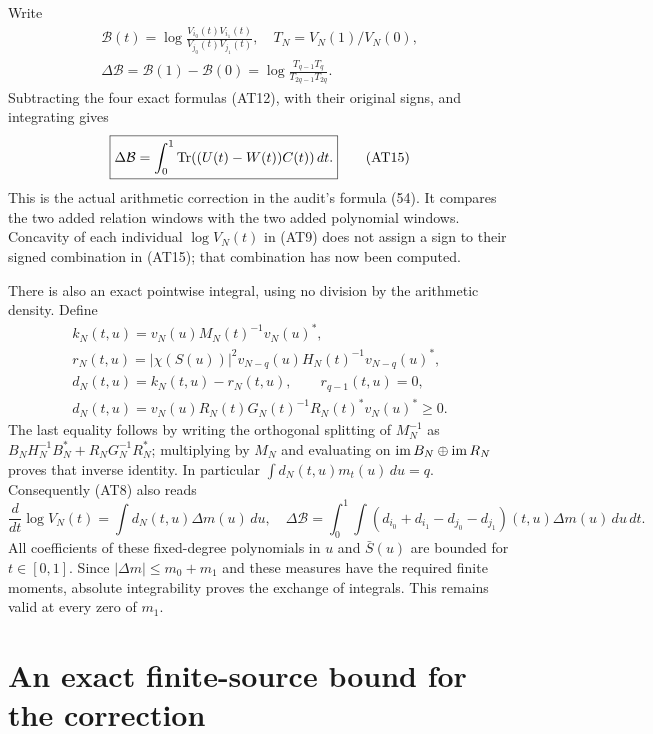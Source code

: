 Write
\[
 \begin{gathered}
 \mathcal B(t)=\log\frac{V_{i_0}(t)V_{i_1}(t)}{V_{j_0}(t)V_{j_1}(t)},
 \quad T_N=V_N(1)/V_N(0),\\
 \Delta\mathcal B=\mathcal B(1)-\mathcal B(0)
 =\log\frac{T_{q-1}T_q}{T_{2q-1}T_{2q}}.       \end{gathered}
 \tag{AT14}
\]
Subtracting the four exact formulas (AT12), with their original
signs, and integrating gives
\[
 \boxed{\displaystyle
 \Delta\mathcal B=\int_0^1\operatorname{Tr}((U(t)-W(t))C(t))\,dt .}
                                                        \tag{AT15}
\]
This is the actual arithmetic correction in the audit's formula
(54). It compares the two added relation windows with the two
added polynomial windows. Concavity of each individual
$\log V_N(t)$ in (AT9) does not assign a sign to their signed
combination in (AT15); that combination has now been computed.

There is also an exact pointwise integral, using no division by
the arithmetic density. Define
\[
 \begin{gathered}
 k_N(t,u)=v_N(u)M_N(t)^{-1}v_N(u)^*,\\
 r_N(t,u)=|\chi(S(u))|^2
 v_{N-q}(u)H_N(t)^{-1}v_{N-q}(u)^*,\\
 d_N(t,u)=k_N(t,u)-r_N(t,u),\qquad r_{q-1}(t,u)=0,\\
 d_N(t,u)=v_N(u)R_N(t)G_N(t)^{-1}R_N(t)^*v_N(u)^*\ge0.
                                                        \end{gathered}
 \tag{AT16}
\]
The last equality follows by writing the orthogonal splitting
of $M_N^{-1}$ as
$B_NH_N^{-1}B_N^*+R_NG_N^{-1}R_N^*$; multiplying by $M_N$
and evaluating on $\operatorname{im} B_N\oplus\operatorname{im} R_N$ proves that inverse
identity. In particular $\int d_N(t,u)m_t(u)\,du=q$.
Consequently (AT8) also reads
\[
 \frac{d}{dt}\log V_N(t)=\int d_N(t,u)\Delta m(u)\,du,
\quad
 \Delta\mathcal B=\int_0^1\int
 (d_{i_0}+d_{i_1}-d_{j_0}-d_{j_1})(t,u)\Delta m(u)\,du\,dt.
                                                        \tag{AT17}
\]
All coefficients of these fixed-degree polynomials in $u$ and
$\bar S(u)$ are bounded for $t\in[0,1]$. Since
$|\Delta m|\le m_0+m_1$ and these measures have the required
finite moments, absolute integrability proves the exchange of
integrals. This remains valid at every zero of $m_1$.

\section{An exact finite-source bound for the correction}

